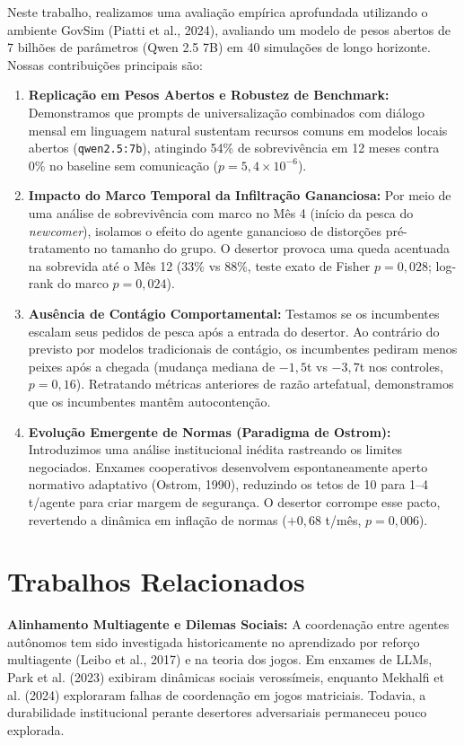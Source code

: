 ﻿\documentclass[11pt,a4paper]{article}
\begin{document}
Neste trabalho, realizamos uma avaliação empírica aprofundada utilizando o ambiente GovSim (Piatti et al., 2024), avaliando um modelo de pesos abertos de 7 bilhões de parâmetros (Qwen 2.5 7B) em 40 simulações de longo horizonte. Nossas contribuições principais são:
\begin{enumerate}[leftmargin=*,itemsep=1pt]
    \item \textbf{Replicação em Pesos Abertos e Robustez de Benchmark:} Demonstramos que prompts de universalização combinados com diálogo mensal em linguagem natural sustentam recursos comuns em modelos locais abertos (\texttt{qwen2.5:7b}), atingindo 54\% de sobrevivência em 12 meses contra 0\% no baseline sem comunicação ($p = 5,4 \times 10^{-6}$).
    \item \textbf{Impacto do Marco Temporal da Infiltração Gananciosa:} Por meio de uma análise de sobrevivência com marco no Mês 4 (início da pesca do \textit{newcomer}), isolamos o efeito do agente ganancioso de distorções pré-tratamento no tamanho do grupo. O desertor provoca uma queda acentuada na sobrevida até o Mês 12 (33\% vs 88\%, teste exato de Fisher $p = 0,028$; log-rank do marco $p = 0,024$).
    \item \textbf{Ausência de Contágio Comportamental:} Testamos se os incumbentes escalam seus pedidos de pesca após a entrada do desertor. Ao contrário do previsto por modelos tradicionais de contágio, os incumbentes pediram menos peixes após a chegada (mudança mediana de $-1,5$t vs $-3,7$t nos controles, $p = 0,16$). Retratando métricas anteriores de razão artefatual, demonstramos que os incumbentes mantêm autocontenção.
    \item \textbf{Evolução Emergente de Normas (Paradigma de Ostrom):} Introduzimos uma análise institucional inédita rastreando os limites negociados. Enxames cooperativos desenvolvem espontaneamente aperto normativo adaptativo (Ostrom, 1990), reduzindo os tetos de 10 para 1--4 t/agente para criar margem de segurança. O desertor corrompe esse pacto, revertendo a dinâmica em inflação de normas ($+0,68$ t/mês, $p = 0,006$).
\end{enumerate}

\section{Trabalhos Relacionados}
\textbf{Alinhamento Multiagente e Dilemas Sociais:} A coordenação entre agentes autônomos tem sido investigada historicamente no aprendizado por reforço multiagente (Leibo et al., 2017) e na teoria dos jogos. Em enxames de LLMs, Park et al. (2023) exibiram dinâmicas sociais verossímeis, enquanto Mekhalfi et al. (2024) exploraram falhas de coordenação em jogos matriciais. Todavia, a durabilidade institucional perante desertores adversariais permaneceu pouco explorada.
\end{document}
